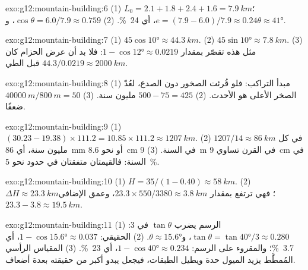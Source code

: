 \begin{solution}{exo:g12:mountain-building:6}
(1) $L_0 = 2.1 + 1.8 + 2.4 + 1.6 = \qty{7.9}{km}$؛
$e = (7.9 - 6.0)/7.9 \approx 0.24$، أي \qty{24}{\percent}. (2) $\cos\theta =
6.0/7.9 \approx 0.759$، و$\theta \approx \ang{41}$.
\end{solution}

\begin{solution}{exo:g12:mountain-building:7}
(1) $45\cos\ang{10} \approx \qty{44.3}{km}$. (2) $45\sin\ang{10} \approx
\qty{7.8}{km}$. (3) مثل هذه  تقصّر بمقدار $1 - \cos\ang{12} \approx 0.0219$:
فلا بد أن عرض الحزام كان $44.3/0.0219 \approx \qty{2000}{km}$ قبل
الطي.
\end{solution}

\begin{solution}{exo:g12:mountain-building:8}
(1) مبدأ التراكب: فلو قُرئت الصخور دون الصدع، لعُدّ الصخر الأعلى
هو الأحدث. (2) $500 - 75 = 425$ مليون سنة. (3) $\qty{40000}{m} /
\qty{800}{m} = 50$ ضعفًا.
\end{solution}

\begin{solution}{exo:g12:mountain-building:9}
(1) $(30.23 - 19.38) \times 111.2 = 10.85 \times 111.2 \approx
\qty{1207}{km}$. (2) $1207/14 \approx \qty{86}{km}$ في كل مليون سنة،
أي \qty{86}{mm} أو نحو \qty{8.6}{cm} في السنة. (3) \qty{9}{m} في القرن تساوي
\qty{9}{cm} في السنة: فالقيمتان متفقتان في حدود نحو \qty{5}{\percent}.
\end{solution}

\begin{solution}{exo:g12:mountain-building:10}
(1) $H = 35/(1 - 0.40) \approx \qty{58}{km}$. (2) $\Delta H \approx
\qty{23.3}{km}$؛ فهي ترتفع بمقدار $23.3 \times 550/3380 \approx
\qty{3.8}{km}$، وعمق  الإضافي $23.3 - 3.8 \approx \qty{19.5}{km}$.
\end{solution}

\begin{solution}{exo:g12:mountain-building:11}
(1) الرسم يضرب $\tan\theta$ في 3: $\tan\theta = \tan\ang{40}/3
\approx 0.280$، و$\theta \approx \ang{15.6}$. (2) الحقيقي: $1 - \cos\ang{15.6}
\approx 0.037$، أي \qty{3.7}{\percent}؛ والمقروء على الرسم: $1 - \cos\ang{40}
\approx 0.234$، أي \qty{23}{\percent}. (3) المقياس الرأسي المُمطَّط يزيد
الميول حدة ويطيل الطبقات، فيجعل  يبدو أكبر من حقيقته
بعدة أضعاف.
\end{solution}

